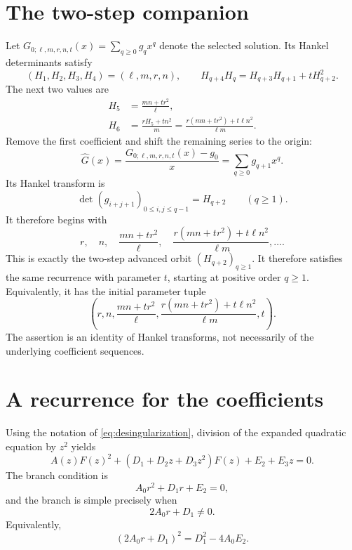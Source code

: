 \documentclass[11pt]{article}
\theoremstyle{remark}
\begin{document}
\section{The two-step companion}
Let $G_{0;\ell,m,r,n,t}(x)=\sum_{q\geq0}g_qx^q$ denote the selected solution.
Its Hankel determinants satisfy
\begin{equation}
 (H_1,H_2,H_3,H_4)=(\ell,m,r,n),\qquad
 H_{q+4}H_q=H_{q+3}H_{q+1}+tH_{q+2}^2.
 \label{eq:parameter-meaning}
\end{equation}
The next two values are
\begin{align}
 H_5&=\frac{mn+tr^2}{\ell}, \label{eq:fifth-Hankel}\\
 H_6&=\frac{rH_5+tn^2}{m}
 =\frac{r(mn+tr^2)+t\ell n^2}{\ell m}. \label{eq:sixth-Hankel}
\end{align}
Remove the first coefficient and shift the remaining series to the origin:
\begin{equation}
 \widehat G(x)=\frac{G_{0;\ell,m,r,n,t}(x)-g_0}{x}
 =\sum_{q\geq0}g_{q+1}x^q.
 \label{eq:coefficient-tail}
\end{equation}
Its Hankel transform is
\begin{equation}
 \det(g_{i+j+1})_{0\leq i,j\leq q-1}
 =H_{q+2}\qquad(q\geq1).
 \label{eq:tail-shift-hankel-identity}
\end{equation}
It therefore begins with
\[
 r,\quad n,\quad
 \frac{mn+tr^2}{\ell},\quad
 \frac{r(mn+tr^2)+t\ell n^2}{\ell m},\ldots .
\]
This is exactly the two-step advanced orbit $(H_{q+2})_{q\geq1}$.  It therefore satisfies the same recurrence with parameter $t$, starting at positive order $q\geq1$.
Equivalently, it has the initial parameter tuple
\begin{equation}
 \left(r,n,
 \frac{mn+tr^2}{\ell},
 \frac{r(mn+tr^2)+t\ell n^2}{\ell m},t\right).
 \label{eq:two-step-parameter-shift}
\end{equation}
The assertion is an identity of Hankel transforms, not necessarily of the
underlying coefficient sequences.  

\section{A recurrence for the coefficients}

Using the notation of \eqref{eq:desingularization}, division of the expanded
quadratic equation by $z^2$ yields
\begin{equation}
 A(z)F(z)^2+(D_1+D_2z+D_3z^2)F(z)+E_2+E_3z=0.
 \label{eq:desingularized-quadratic}
\end{equation}
The branch condition is
\begin{equation}
 A_0r^2+D_1r+E_2=0,
 \label{eq:branch-selection}
\end{equation}
and the branch is simple precisely when
\begin{equation}
 2A_0r+D_1\ne0.
 \label{eq:nondegeneracy}
\end{equation}
Equivalently,
\begin{equation}
 (2A_0r+D_1)^2=D_1^2-4A_0E_2.
 \label{eq:branch-discriminant}
\end{equation}
\end{document}
